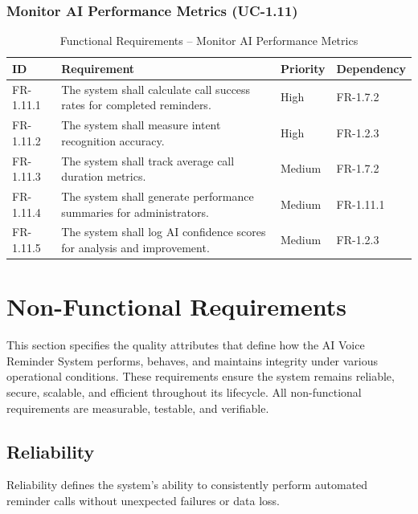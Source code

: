 \documentclass[12pt,a4paper]{report}
\begin{document}
\subsubsection{Monitor AI Performance Metrics (UC-1.11)}

\begin{table}[H]
\centering
\caption{Functional Requirements – Monitor AI Performance Metrics}
\begin{tabularx}{\textwidth}{|l|X|l|l|}
\hline
\textbf{ID} & \textbf{Requirement} & \textbf{Priority} & \textbf{Dependency} \\ \hline

FR-1.11.1 & The system shall calculate call success rates for completed reminders. & High & FR-1.7.2 \\ \hline

FR-1.11.2 & The system shall measure intent recognition accuracy. & High & FR-1.2.3 \\ \hline

FR-1.11.3 & The system shall track average call duration metrics. & Medium & FR-1.7.2 \\ \hline

FR-1.11.4 & The system shall generate performance summaries for administrators. & Medium & FR-1.11.1 \\ \hline

FR-1.11.5 & The system shall log AI confidence scores for analysis and improvement. & Medium & FR-1.2.3 \\ \hline

\end{tabularx}
\end{table}
\section{Non-Functional Requirements}

This section specifies the quality attributes that define how the AI Voice Reminder System performs, behaves, and maintains integrity under various operational conditions. These requirements ensure the system remains reliable, secure, scalable, and efficient throughout its lifecycle. All non-functional requirements are measurable, testable, and verifiable.
\subsection{Reliability}

Reliability defines the system’s ability to consistently perform automated reminder calls without unexpected failures or data loss.
\end{document}
